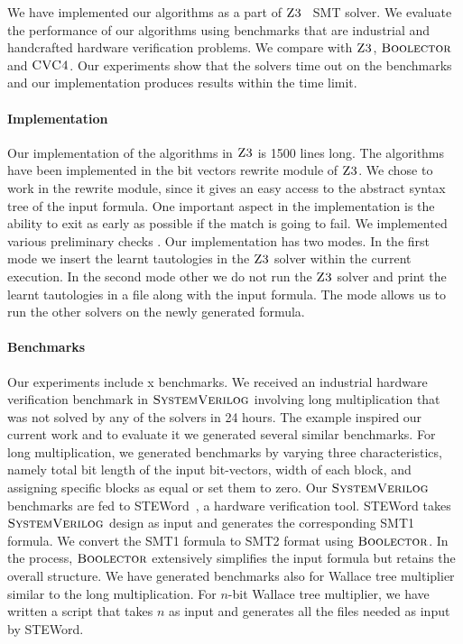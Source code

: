 

We have implemented our algorithms as a part of $\textsc{Z3}$~\cite{z3} SMT solver.
%
 We evaluate the performance of our algorithms using benchmarks that are industrial and handcrafted hardware verification problems.
%
We compare with $\textsc{Z3}$, $\textsc{Boolector}$\cite{boolector} and $\textsc{CVC4}$\cite{cvc4}.
%
Our experiments show that the solvers time out on the benchmarks and our implementation produces results within the time limit.

\paragraph{\bf Implementation}
Our implementation of the algorithms in $\textsc{Z3}$ is 1500 lines long.
%
The algorithms have been implemented in the bit vectors rewrite module of $\textsc{Z3}$.
%
We chose to work in the rewrite module, since it gives an easy access to the abstract syntax tree of the input formula.
%
One important aspect in the implementation is the ability to exit as early as possible if the match is going to fail.
%
We implemented various preliminary checks .
%
Our implementation has two modes.
%
In the first mode we insert the learnt tautologies in the $\textsc{Z3}$ solver within the current execution.
%
In the second mode other we do not run  the $\textsc{Z3}$ solver and print the learnt tautologies in a file along with the input formula.
%
The mode allows us to run the other solvers on the newly generated formula.

\paragraph{\bf Benchmarks}
%
Our experiments include x benchmarks.
%
We received an industrial hardware verification benchmark in $\textsc{SystemVerilog}$ involving long multiplication that was not solved by any of the solvers in 24 hours.
%
The example inspired our current work and to evaluate it we generated several similar benchmarks.
%
For long multiplication, we generated benchmarks by varying three characteristics, namely total bit length of the input bit-vectors, width of each block, and assigning specific blocks as equal or set them to zero.
%
Our $\textsc{SystemVerilog}$ benchmarks are fed to STEWord~\cite{Word-level-Symbolic-Trajectory-Evaluation}, a hardware verification tool.
%
STEWord takes $\textsc{SystemVerilog}$ design as input and generates the corresponding SMT1 formula.
%
We convert the SMT1 formula to SMT2 format using $\textsc{Boolector}$.
%
In the process, $\textsc{Boolector}$ extensively simplifies the input formula but retains the overall structure.
%
We have generated benchmarks also for Wallace tree multiplier similar to the long multiplication.
%
For $n$-bit Wallace tree multiplier, we have written a script that takes $n$ as input and generates all the files needed as input by STEWord.
%

